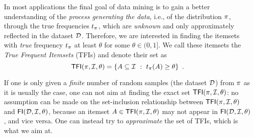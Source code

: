 In most applications the final goal of data mining is to gain a better
understanding of the \emph{process generating the data}, i.e., of the
distribution $\pi$, through the true frequencies $t_\pi$, which are
\emph{unknown} and only approximately reflected in the dataset ${\cal D}$. Therefore, %
we are interested in finding the itemsets with \emph{true} frequency
$t_\pi$ at least $\theta$ for some $\theta\in(0,1]$. We call these itemsets the
\emph{True Frequent Itemsets} (TFIs) and denote their set as %
\[
\mathsf{TFI}(\pi,{\cal I},\theta)=\{A\subseteq{\cal I} ~:~ t_\pi(A)\ge\theta\}\enspace.\]

If one is only given a \emph{finite} number of random
samples (the dataset ${\cal D}$) from $\pi$ as it is usually the case, one can not
aim at finding the exact set $\mathsf{TFI}(\pi,{\cal I},\theta)$: no assumption can be
made on the set-inclusion relationship between $\mathsf{TFI}(\pi,{\cal I},\theta)$ and
$\mathsf{FI}({\cal D},{\cal I},\theta)$,
because an itemset $A\in\mathsf{TFI}(\pi,{\cal I},\theta)$ may not appear in
$\mathsf{FI}({\cal D},{\cal I},\theta)$, and vice versa. One can instead try
to \emph{approximate} the set of TFIs, which is what we aim at.


